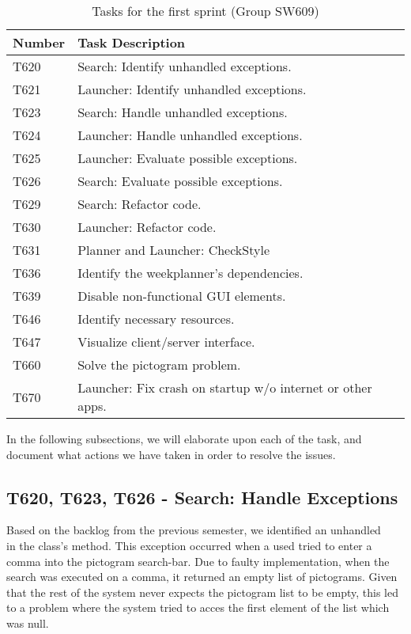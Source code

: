 \begin{table}[H]
\centering
\begin{tabular}{|l|l|}
\hline
Number 			& Task Description 											\\\hline
T620  			& Search: Identify unhandled exceptions.                 	\\\hline
T621    	   	& Launcher: Identify unhandled exceptions. 					\\\hline 
T623	       	& Search: Handle unhandled exceptions.                 		\\\hline
T624    	   	& Launcher: Handle unhandled exceptions.  					\\\hline
T625   	   		& Launcher: Evaluate possible exceptions.        			\\\hline
T626   	   		& Search: Evaluate possible exceptions.                		\\\hline
T629  	   		& Search: Refactor code.			   						\\\hline
T630       		& Launcher: Refactor code.                 					\\\hline
T631       		& Planner and Launcher: CheckStyle                 			\\\hline
T636			& Identify the weekplanner's dependencies.					\\\hline
T639       		& Disable non-functional GUI elements.               		\\\hline
T646       		& Identify necessary resources.                 			\\\hline 
T647       		& Visualize client/server interface.                 		\\\hline 
T660       		& Solve the pictogram problem.                 				\\\hline
T670       		& Launcher: Fix crash on startup w/o internet or other apps.\\\hline
\end{tabular}
\caption{Tasks for the first sprint (Group SW609)} 
\label{SprintOneTasks}    
\end{table} 

In the following subsections, we will elaborate upon each of the task, and
document what actions we have taken in order to resolve the issues.

\subsection{T620, T623, T626 - Search: Handle Exceptions}
Based on the backlog from the previous semester, we identified an unhandled
\\ in the  class's
 method. This exception occurred when a used tried to enter a
comma into the pictogram search-bar. Due to faulty implementation, when the
search was executed on a comma, it returned an empty list of pictograms. Given
that the rest of the system never expects the pictogram list to be empty, this
led to a problem where the system tried to acces the first element of the list
which was null.\nl

